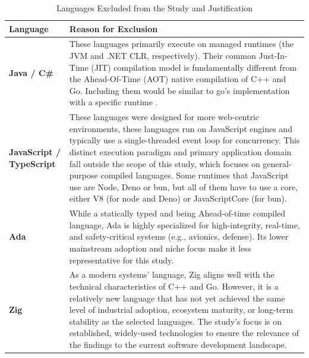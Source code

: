 \begin{table}[!ht]
	\centering
	\caption{Languages Excluded from the Study and Justification}
	\label{tab:excluded_languages}
	\begin{tabularx}{\textwidth}{
		>{\raggedright\arraybackslash}p{}
		>{\raggedright\arraybackslash}X
	}
		\toprule
		\textbf{Language} & \textbf{Reason for Exclusion} \\
		\midrule
		
		\textbf{Java / C\#} &
		These languages primarily execute on managed runtimes (the JVM and .NET CLR, respectively). Their common Just-In-Time (JIT) compilation model is fundamentally different from the Ahead-Of-Time (AOT) native compilation of C++ and Go. Including them would be similar to go's implementation with a specific runtime . \\
		\addlinespace
		
		\textbf{JavaScript / TypeScript} &
		These languages were designed for more web-centric environments, these languages run on JavaScript engines and typically use a single-threaded event loop for concurrency. This distinct execution paradigm and primary application domain fall outside the scope of this study, which focuses on general-purpose compiled languages. Some runtimes that JavaScript use are Node, Deno or bun, but all of them have to use a core, either \gls{V8} (for node and Deno) or JavaScriptCore (for bun). \\
		\addlinespace
		
		\textbf{Ada} &
		While a statically typed and being Ahead-of-time compiled language, Ada is highly specialized for high-integrity, real-time, and safety-critical systems (e.g., avionics, defense). Its lower mainstream adoption and niche focus make it less representative for this study. \\
		\addlinespace
		
		\textbf{Zig} &
		As a modern systems' language, Zig aligns well with the technical characteristics of C++ and Go. However, it is a relatively new language that has not yet achieved the same level of industrial adoption, ecosystem maturity, or long-term stability as the selected languages. The study's focus is on established, widely-used technologies to ensure the relevance of the findings to the current software development landscape. \\
		\bottomrule
	\end{tabularx}
\end{table}



